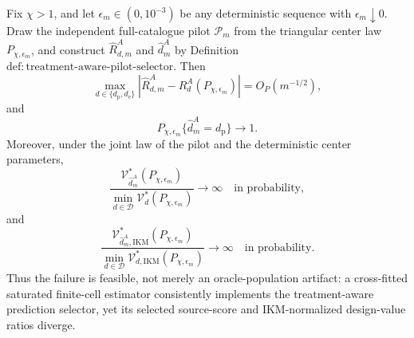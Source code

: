 Fix \(\chi>1\), and let \(\epsilon_m\in(0,10^{-3})\) be any deterministic sequence with \(\epsilon_m\downarrow0\).  Draw the independent full-catalogue pilot \(\mathcal P_m\) from the triangular center law \(P_{\chi,\epsilon_m}\), and construct \(\widehat R_{d,m}^A\) and \(\widehat d_m^A\) by Definition~\(\mathrm{def{:}treatment\text{-}aware\text{-}pilot\text{-}selector}\).  Then
\[
 \max_{d\in\{d_{\mathrm p},d_{\mathrm e}\}}
 \left|\widehat R_{d,m}^A-R_d^A(P_{\chi,\epsilon_m})\right|
 =O_P(m^{-1/2}),                                                              \tag{1}
\]
and
\[
 P_{\chi,\epsilon_m}\{\widehat d_m^A=d_{\mathrm p}\}\longrightarrow1.      \tag{2}
\]
Moreover, under the joint law of the pilot and the deterministic center parameters,
\[
 \frac{\mathcal V_{\widehat d_m^A}^*(P_{\chi,\epsilon_m})}
 {\min_{d\in\mathcal D}\mathcal V_d^*(P_{\chi,\epsilon_m})}
 \longrightarrow\infty\quad\text{in probability},                           \tag{3}
\]
and
\[
 \frac{\mathcal V_{\widehat d_m^A,\mathrm{IKM}}^*(P_{\chi,\epsilon_m})}
 {\min_{d\in\mathcal D}\mathcal V_{d,\mathrm{IKM}}^*(P_{\chi,\epsilon_m})}
 \longrightarrow\infty\quad\text{in probability}.                           \tag{4}
\]
Thus the failure is feasible, not merely an oracle-population artifact: a cross-fitted saturated finite-cell estimator consistently implements the treatment-aware prediction selector, yet its selected source-score and IKM-normalized design-value ratios diverge.